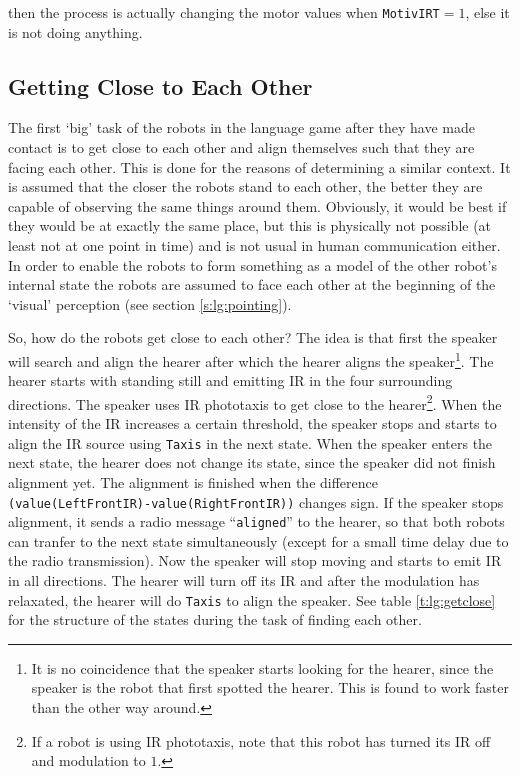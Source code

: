 \p
then the process is actually changing the motor values when \texttt{MotivIRT}$=1$, else it is not doing anything.


\subsection{Getting Close to Each Other}

The first `big' task of the robots in the language game after they have made contact is to get close to each other and align themselves such that they are facing each other. This is done for the reasons of determining a similar context. It is assumed that the closer the robots stand to each other, the better they are capable of observing the same things around them. Obviously, it would be best if they would be at exactly the same place, but this is physically not possible (at least not at one point in time) and is not usual in human communication either. In order to enable the robots to form something as a model of the other robot's internal state the robots are assumed to face each other at the beginning of the `visual' perception (see section \ref{s:lg:pointing}).

\p
So, how do the robots get close to each other? The idea is that first the speaker will search and align the hearer after which the hearer aligns the speaker\footnote{It is no coincidence that the speaker starts looking for the hearer, since the speaker is the robot that first spotted the hearer. This is found to work faster than the other way around.}. The hearer starts with standing still and emitting IR in the four surrounding directions. The speaker uses IR phototaxis to get close to the hearer\footnote{If a robot is using IR phototaxis, note that this robot has turned its IR off and modulation to $1$.}. When the intensity of the IR increases a certain threshold, the speaker stops and starts to align the IR source using \texttt{Taxis} in the next state. When the speaker enters the next state, the hearer does not change its state, since the speaker did not finish alignment yet. The alignment is finished when the difference \texttt{(value(LeftFrontIR)-value(RightFrontIR))} changes sign. If the speaker stops alignment, it sends a radio message ``\texttt{aligned}'' to the hearer, so that both robots can tranfer to the next state simultaneously (except for a small time delay due to the radio transmission). Now the speaker will stop moving and starts to emit IR in all directions. The hearer will turn off its IR and after the modulation has relaxated, the hearer will do \texttt{Taxis} to align the speaker. See table \ref{t:lg:getclose} for the structure of the states during the task of finding each other.

